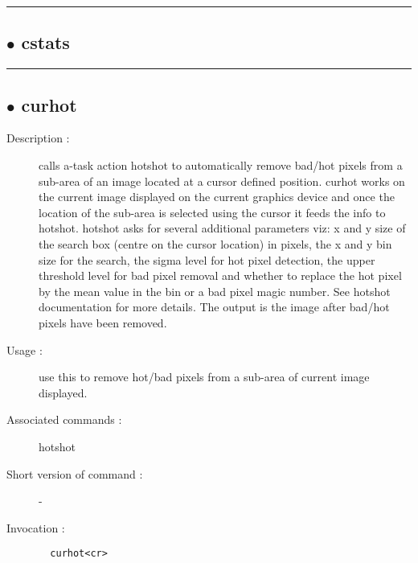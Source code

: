 \hrule \subsection*{$\bullet$ cstats}

\hrule \subsection*{$\bullet$ curhot}
\begin{description}
\item[Description :] calls a-task action hotshot to automatically remove bad/hot
pixels from a sub-area of an image located at a cursor defined position.
curhot works on the current image displayed on the current graphics
device and once the location of the sub-area is selected using the cursor
it feeds the info to hotshot.  hotshot asks for several additional
parameters viz: x and y size of the search box (centre on the cursor
location) in pixels, the x and y bin size for the search, the sigma level
for hot pixel detection, the upper threshold level for bad pixel removal
and whether to replace the hot pixel by the mean value in the bin or a
bad pixel magic number.  See hotshot documentation for more details. The
output is the image after bad/hot pixels have been removed.
\item[Usage :] use this to remove hot/bad pixels from a sub-area of current
image displayed.
\item[Associated commands :] hotshot
\item[Short version of command :] -
\item[Invocation :]

\verb+  curhot<cr> +\end{description}

